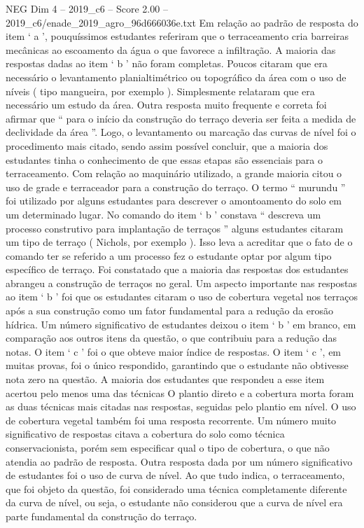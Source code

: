 \begin{textsample}{NEG Dim 4 – 2019\_c6 – Score 2.00 – 2019\_c6/enade\_2019\_agro\_96d666036e.txt}
Em relação ao padrão de resposta do item ‘ a ’, pouquíssimos estudantes referiram que o terraceamento cria barreiras mecânicas ao escoamento da água o que favorece a infiltração.
A maioria das respostas dadas ao item ‘ b ’ não foram completas.
Poucos citaram que era necessário o levantamento planialtimétrico ou topográfico da área com o uso de níveis ( tipo mangueira, por exemplo ).
Simplesmente relataram que era necessário um estudo da área.
Outra resposta muito frequente e correta foi afirmar que “ para o início da construção do terraço deveria ser feita a medida de declividade da área ”.
Logo, o levantamento ou marcação das curvas de nível foi o procedimento mais citado, sendo assim possível concluir, que a maioria dos estudantes tinha o conhecimento de que essas etapas são essenciais para o terraceamento.
Com relação ao maquinário utilizado, a grande maioria citou o uso de grade e terraceador para a construção do terraço.
O termo “ murundu ” foi utilizado por alguns estudantes para descrever o amontoamento do solo em um determinado lugar.
No comando do item ‘ b ’ constava “ descreva um processo construtivo para implantação de terraços ” alguns estudantes citaram um tipo de terraço ( Nichols, por exemplo ).
Isso leva a acreditar que o fato de o comando ter se referido a um processo fez o estudante optar por algum tipo específico de terraço.
Foi constatado que a maioria das respostas dos estudantes abrangeu a construção de terraços no geral.
Um aspecto importante nas respostas ao item ‘ b ’ foi que os estudantes citaram o uso de cobertura vegetal nos terraços após a sua construção como um fator fundamental para a redução da erosão hídrica.
Um número significativo de estudantes deixou o item ‘ b ’ em branco, em comparação aos outros itens da questão, o que contribuiu para a redução das notas.
O item ‘ c ’ foi o que obteve maior índice de respostas.
O item ‘ c ’, em muitas provas, foi o único respondido, garantindo que o estudante não obtivesse nota zero na questão.
A maioria dos estudantes que respondeu a esse item acertou pelo menos uma das técnicas O plantio direto e a cobertura morta foram as duas técnicas mais citadas nas respostas, seguidas pelo plantio em nível.
O uso de cobertura vegetal também foi uma resposta recorrente.
Um número muito significativo de respostas citava a cobertura do solo como técnica conservacionista, porém sem especificar qual o tipo de cobertura, o que não atendia ao padrão de resposta.
Outra resposta dada por um número significativo de estudantes foi o uso de curva de nível.
Ao que tudo indica, o terraceamento, que foi objeto da questão, foi considerado uma técnica completamente diferente da curva de nível, ou seja, o estudante não considerou que a curva de nível era parte fundamental da construção do terraço.

\end{textsample}
